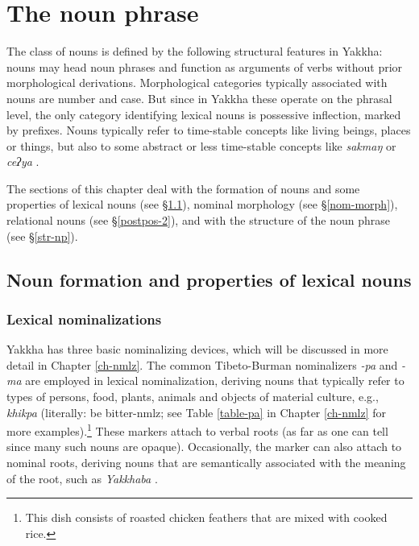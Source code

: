 ﻿\chapter{The noun phrase}\label{ch-noun}

The class of nouns is defined by the following structural features in Yakkha: nouns may head noun phrases and function as arguments of verbs without prior morphological derivations. Morphological categories typically associated with nouns are number and case. But since in Yakkha these operate on the phrasal level, the only category identifying lexical nouns is possessive inflection, marked by prefixes. Nouns typically refer to time-stable concepts like living beings, places or things, but also to some abstract or less time-stable concepts like \emph{sakmaŋ}  or \emph{ceʔya} .

The sections of this chapter deal with the formation of nouns and some properties of lexical nouns (see §\ref{lex-noun}), nominal morphology (see §\ref{nom-morph}),  relational nouns (see §\ref{postpos-2}), and with the structure of the noun phrase (see §\ref{str-np}). 

\section{Noun formation and properties of lexical nouns}\label{lex-noun}

\subsection{Lexical nominalizations}\label{lex-noun-1}

Yakkha has three basic nominalizing devices, which will be discussed in more detail in Chapter \ref{ch-nmlz}. The common Tibeto-Burman nominalizers \emph{-pa} and \emph{-ma} are employed in lexical nominalization, deriving nouns that typically refer to types of persons, food, plants, animals and objects of material culture, e.g.,  \emph{khikpa}  (literally: be bitter-{\sc nmlz}; see Table \ref{table-pa} in Chapter \ref{ch-nmlz} for  more examples).\footnote{This dish consists of  roasted chicken feathers that are mixed with cooked rice.} These markers attach to verbal roots (as far as one can tell since many such nouns are opaque).  Occasionally, the marker can also attach to nominal roots, deriving nouns that are semantically associated with the meaning of the root, such as  \emph{Yakkhaba} . 


